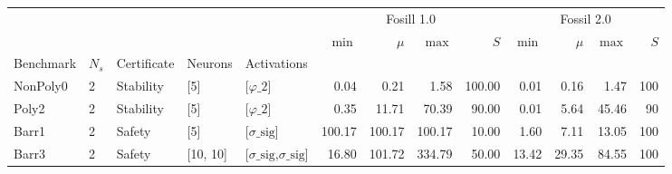 \begin{tabular}{lllllrrrrrrrr}
\toprule
 &  &  &  &  & \multicolumn{4}{c}{Fosill 1.0} & \multicolumn{4}{c}{Fossil 2.0} \\
 &  &  &  &  & $\min$ & $\mu$ & $\max$ & $S$ & $\min$ & $\mu$ & $\max$ & $S$ \\
Benchmark & $N_s$ & Certificate & Neurons & Activations &  &  &  &  &  &  &  &  \\
\midrule
NonPoly0 & 2 & Stability & [5] & [$\varphi\_{2}$] & 0.04 & 0.21 & 1.58 & 100.00 & 0.01 & 0.16 & 1.47 & 100 \\
\cline{1-13} \cline{2-13} \cline{3-13} \cline{4-13}
Poly2 & 2 & Stability & [5] & [$\varphi\_{2}$] & 0.35 & 11.71 & 70.39 & 90.00 & 0.01 & 5.64 & 45.46 & 90 \\
\cline{1-13} \cline{2-13} \cline{3-13} \cline{4-13}
Barr1 & 2 & Safety & [5] & [$\sigma\_{\mathrm{sig}}$] & 100.17 & 100.17 & 100.17 & 10.00 & 1.60 & 7.11 & 13.05 & 100 \\
\cline{1-13} \cline{2-13} \cline{3-13} \cline{4-13}
Barr3 & 2 & Safety & [10, 10] & [$\sigma\_{\mathrm{sig}}$,$\sigma\_{\mathrm{sig}}$] & 16.80 & 101.72 & 334.79 & 50.00 & 13.42 & 29.35 & 84.55 & 100 \\
\cline{1-13} \cline{2-13} \cline{3-13} \cline{4-13}
\bottomrule
\end{tabular}

